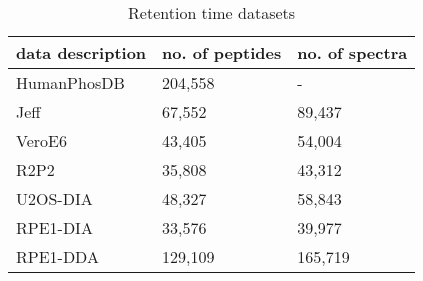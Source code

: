 %
%
%
%
%
%
%
%



\begin{table}
   \begin{center}
   \begin{tabularx}{\columnwidth}{|m{}|Y|Y|}
   \hline
   data description & no. of peptides & no. of spectra\\
   \hline
   HumanPhosDB~\cite{lawrence2016plug} & 204,558 & -\\
   Jeff~\cite{liu2018vivo} & 67,552 & 89,437\\
   VeroE6~\cite{bouhaddou2020global} & 43,405  & 54,004\\
   R2P2~\cite{leutert2019r2} & 35,808 & 43,312\\
   U2OS-DIA~\cite{wang2020naguider} & 48,327 & 58,843\\
   RPE1-DIA~\cite{bekker2020rapid} & 33,576 & 39,977\\
   RPE1-DDA~\cite{bekker2020rapid} & 129,109 & 165,719\\
   \hline
   \end{tabularx}
   \end{center}
   \caption{Retention time datasets}
   \label{table:Datasets}
\end{table}

\begin{table}
  \begin{center}
  \end{center}
  \caption{RT Dataset results. The left number in cell is $\Delta$$t_{95\%}$ where the lower is the better, and the right is PCC where the higher is the better.}
  \label{table:RT results}
\end{table}

